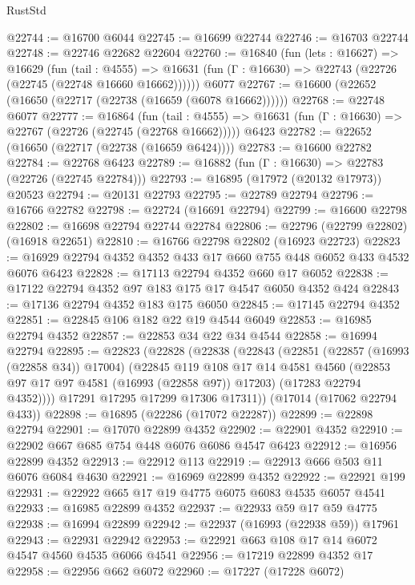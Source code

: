 \begin{lexlean}{RustStd}
\begin{coremodule}
@22744 := @16700 @6044
@22745 := @16699 @22744
@22746 := @16703 @22744
@22748 := @22746 @22682 @22604
@22760 := @16840
    (fun (lets : @16627) =>
    @16629
      (fun (tail : @4555) =>
      @16631 (fun (Γ : @16630) => @22743 (@22726 (@22745 (@22748 @16660 @16662))))))
    @6077
@22767 := @16600 (@22652 (@16650 (@22717 (@22738 (@16659 (@6078 @16662))))))
@22768 := @22748 @6077
@22777 := @16864
    (fun (tail : @4555) => @16631 (fun (Γ : @16630) => @22767 (@22726 (@22745 (@22768 @16662)))))
    @6423
@22782 := @22652 (@16650 (@22717 (@22738 (@16659 @6424))))
@22783 := @16600 @22782
@22784 := @22768 @6423
@22789 := @16882 (fun (Γ : @16630) => @22783 (@22726 (@22745 @22784)))
@22793 := @16895 (@17972 (@20132 @17973)) @20523
@22794 := @20131 @22793
@22795 := @22789 @22794
@22796 := @16766 @22782
@22798 := @22724 (@16691 @22794)
@22799 := @16600 @22798
@22802 := @16698 @22794 @22744 @22784
@22806 := @22796 (@22799 @22802) (@16918 @22651)
@22810 := @16766 @22798 @22802 (@16923 @22723)
@22823 := @16929 @22794 @4352 @4352 @433 @17 @660 @755 @448 @6052 @433 @4532 @6076 @6423
@22828 := @17113 @22794 @4352 @660 @17 @6052
@22838 := @17122 @22794 @4352 @97 @183 @175 @17 @4547 @6050 @4352 @424
@22843 := @17136 @22794 @4352 @183 @175 @6050
@22845 := @17145 @22794 @4352
@22851 := @22845 @106 @182 @22 @19 @4544 @6049
@22853 := @16985 @22794 @4352
@22857 := @22853 @34 @22 @34 @4544
@22858 := @16994 @22794
@22895 := @22823
    (@22828
      (@22838
        (@22843
          (@22851
            (@22857 (@16993 (@22858 @34)) @17004)
            (@22845
              @119
              @108
              @17
              @14
              @4581
              @4560
              (@22853 @97 @17 @97 @4581 (@16993 (@22858 @97)) @17203)
              (@17283 @22794 @4352))))
        @17291
        @17295
        @17299
        @17306
        @17311))
    (@17014 (@17062 @22794 @433))
@22898 := @16895 (@22286 (@17072 @22287))
@22899 := @22898 @22794
@22901 := @17070 @22899 @4352
@22902 := @22901 @4352
@22910 := @22902 @667 @685 @754 @448 @6076 @6086 @4547 @6423
@22912 := @16956 @22899 @4352
@22913 := @22912 @113
@22919 := @22913 @666 @503 @11 @6076 @6084 @4630
@22921 := @16969 @22899 @4352
@22922 := @22921 @199
@22931 := @22922 @665 @17 @19 @4775 @6075 @6083 @4535 @6057 @4541
@22933 := @16985 @22899 @4352
@22937 := @22933 @59 @17 @59 @4775
@22938 := @16994 @22899
@22942 := @22937 (@16993 (@22938 @59)) @17961
@22943 := @22931 @22942
@22953 := @22921 @663 @108 @17 @14 @6072 @4547 @4560 @4535 @6066 @4541
@22956 := @17219 @22899 @4352 @17
@22958 := @22956 @662 @6072
@22960 := @17227 (@17228 @6072)

\end{coremodule}
\end{lexlean}
